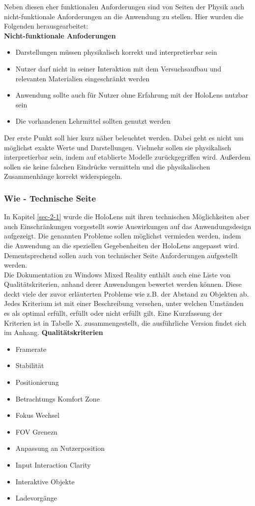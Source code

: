 Neben diesen eher funktionalen Anforderungen sind von Seiten der Physik auch nicht-funktionale Anforderungen an die Anwendung zu stellen. Hier wurden die Folgenden herausgearbeitet:\\[4px]
\textbf{Nicht-funktionale Anfoderungen}
\begin{itemize}[topsep=-2px]
	\setlength{\itemsep}{-5pt}
	\item Darstellungen müssen physikalisch korrekt und interpretierbar sein
	\item Nutzer darf nicht in seiner Interaktion mit dem Versuchsaufbau und relevanten Materialien eingeschränkt werden
	\item Anwendung sollte auch für Nutzer ohne Erfahrung mit der HoloLens nutzbar sein
	\item Die vorhandenen Lehrmittel sollten genutzt werden
\end{itemize}
\vspace{4px}
Der erste Punkt soll hier kurz näher beleuchtet werden. Dabei geht es nicht um möglichst exakte Werte und Darstellungen. Vielmehr sollen sie physikalisch interpretierbar sein, indem auf etablierte Modelle zurückgegriffen wird. Außerdem sollen sie keine falschen Eindrücke vermitteln und die physikalischen Zusammenhänge korrekt widerspiegeln.\\

\subsubsection{Wie - Technische Seite}
In Kapitel \ref{sec-2-1} wurde die HoloLens mit ihren technischen Möglichkeiten aber auch Einschränkungen vorgestellt sowie Auswirkungen auf das Anwendungsdesign aufgezeigt. Die genannten Probleme sollen möglichst vermieden werden, indem die Anwendung an die speziellen Gegebenheiten der HoloLens angepasst wird. Dementsprechend sollen auch von technischer Seite Anforderungen aufgestellt werden.\\

Die Dokumentation zu Windows Mixed Reality enthält auch eine Liste von Qualitätskriterien, anhand derer Anwendungen bewertet werden können. Diese deckt viele der zuvor erläuterten Probleme wie z.B. der Abstand zu Objekten ab. Jedes Kriterium ist mit einer Beschreibung versehen, unter welchen Umständen es als optimal erfüllt, erfüllt oder nicht erfüllt gilt. Eine Kurzfassung der Kriterien ist in Tabelle X. zusammengestellt, die ausführliche Version findet sich im Anhang.
\textbf{Qualitätskriterien}
\begin{itemize}
	\setlength{\itemsep}{-5pt}
	\item Framerate
	\item Stabilität
	\item Positionierung
	\item Betrachtungs Komfort Zone
	\item Fokus Wechsel
	\item FOV Grenezn
	\item Anpassung an Nutzerposition
	\item Input Interaction Clarity
	\item Interaktive Objekte
	\item Ladevorgänge
\end{itemize}

